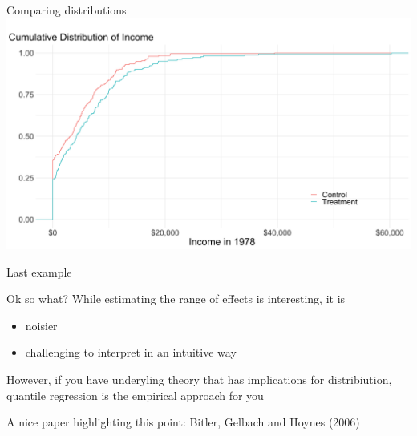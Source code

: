 \documentclass[notes,11pt, aspectratio=169]{beamer}
\newenvironment{wideitemize}{\itemize\addtolength{\itemsep}{10pt}}{\enditemize}
\begin{document}
\begin{frame}{Comparing distributions}
        \includegraphics[width=\linewidth]{quantile_cdf_nsw.png}
\end{frame}

\begin{frame}{Last example}
  \begin{wideitemize}
  \item Ok so what? While estimating the range of effects is interesting, it is
    \begin{itemize}
    \item noisier
    \item challenging to interpret in an intuitive way
    \end{itemize}
  \item However, if you have underyling theory that has implications for
    distribiution, quantile regression is the empirical approach for you
  \item A nice paper highlighting this point: Bitler, Gelbach and Hoynes (2006)
  \end{wideitemize}
\end{frame}
\end{document}
